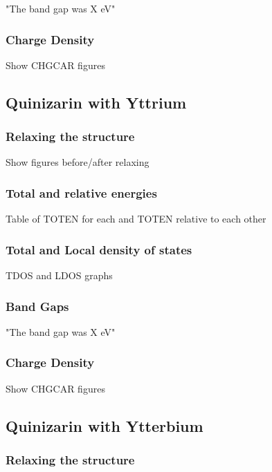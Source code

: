 \documentclass{article}
\begin{document}
      "The band gap was X eV"

    \subsubsection{Charge Density}

      Show CHGCAR figures

  \subsection{Quinizarin with Yttrium}

    \subsubsection{Relaxing the structure}

      Show figures before/after relaxing

    \subsubsection{Total and relative energies}

      Table of TOTEN for each and TOTEN relative to each other

    \subsubsection{Total and Local density of states}

      TDOS and LDOS graphs

    \subsubsection{Band Gaps}

      "The band gap was X eV"

    \subsubsection{Charge Density}

      Show CHGCAR figures

  \subsection{Quinizarin with Ytterbium}

    \subsubsection{Relaxing the structure}
\end{document}
